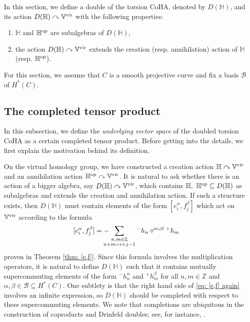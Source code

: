 \documentclass[10pt]{amsart}
\newcommand{\BZ}{\mathbb{Z}}
\newcommand{\BH}{\mathbb{H}}
\newcommand{\BV}{\mathbb{V}}
\newcommand{\CB}{\mathcal{B}}
\newcommand{\op}{\textnormal{op}}
\newcommand{\+}{{}^+}
\newcommand{\vir}{\textnormal{vir}}
\theoremstyle{definition}
\theoremstyle {definition}
\theoremstyle {definition}
\begin{document}
In this section, we define a double of the torsion CoHA, denoted by $D(\BH)$, and its action $D(\BH)\curvearrowright\BV^\vir$ with the following properties:
\begin{enumerate}
    \item [i)] $\BH$ and $\BH^{\op}$ are subalgebras of $D(\BH)$,
    \item [ii)] the action $D(\BH)\curvearrowright\BV^\vir$ extends the creation (resp. annihilation) action of $\BH$ (resp. $\BH^{\op}$). 
\end{enumerate}
For this section, we assume that $C$ is a smooth projective curve and fix a basis $\CB$ of $H^*(C)$. 

\subsection{The completed tensor product}

In this subsection, we define the {\it underlying vector space} of the doubled torsion CoHA as a certain completed tensor product. Before getting into the details, we first explain the motivation behind its definition. 

On the virtual homology group, we have constructed a creation action $\BH\curvearrowright \BV^\vir$ and an annihilation action $\BH^\op\curvearrowright\BV^\vir$. It is natural to ask whether there is an action of a bigger algebra, say $D(\BH)\curvearrowright \BV^\vir$, which contains $\BH,\ \BH^\op\subseteq D(\BH)$ as subalgebras and extends the creation and annihilation action. If such a structure exists, then $D(\BH)$ must contain elements of the form $[e_i^\alpha, f_j^\beta]$ which act on $\BV^\vir$ according to the formula 
\begin{equation}\label{eq: [e,f] again}
    [e^\alpha_i, f^\beta_j]=-\hspace{-10pt}\sum_{\substack{n,m\in \BZ\\ n+m=i+j-1}} {}^{-}h_n\circ^{\alpha\cup \beta}{}^{+}h_m
\end{equation}
proven in Theorem \ref{thm: [e,f]}. Since this formula involves the multiplication operators, it is natural to define $D(\BH)$ such that it contains mutually supercommuting elements of the form ${}^-h_n^\alpha$ and ${}^+h_m^\beta$ for all $n, m\in \BZ$ and $\alpha, \beta\in \CB\subseteq H^*(C)$. One subtlety is that the right hand side of \eqref{eq: [e,f] again} involves an infinite expression, so $D(\BH)$ should be completed with respect to these supercommuting elements. We note that completions are ubiquitous in the construction of coproducts and Drinfeld doubles; see, for instance, \cite{Schiffmann, YZ, N4}. 
\end{document}
